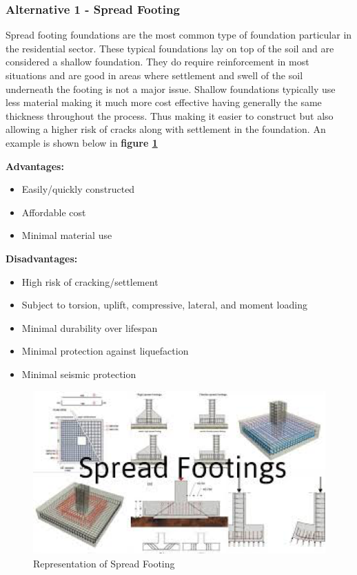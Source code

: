 \documentclass{ceri}
\begin{document}
\subsubsection{Alternative 1 - Spread Footing}
Spread footing foundations are the most common type of foundation particular in the residential sector. These typical foundations lay on top of the soil and are considered a shallow foundation. They do require reinforcement in most situations and are good in areas where settlement and swell of the soil underneath the footing is not a major issue. Shallow foundations typically use less material making it much more cost effective having generally the same thickness throughout the process. Thus making it easier to construct but also allowing a higher risk of cracks along with settlement in the foundation. An example is shown below in \textbf{figure \ref{fig:Austin1}}

	\textbf{Advantages:}
\begin{itemize}
\item  Easily/quickly constructed
\item  Affordable cost
\item  Minimal material use
\end{itemize}
   
   	\textbf{Disadvantages:}
\begin{itemize}
\item  High risk of cracking/settlement
\item  Subject to torsion, uplift, compressive, lateral, and moment loading
\item  Minimal durability over lifespan 
\item  Minimal protection against liquefaction
\item  Minimal seismic protection
\end{itemize}


\begin{figure}[H]
    \centering
    \includegraphics[width=.5\textwidth]{images/Austin1.png}
    \caption{Representation of Spread Footing}
    \label{fig:Austin1}
\end{figure}
\end{document}
